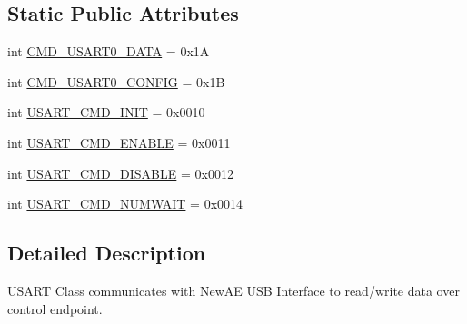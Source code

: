 \subsection*{Static Public Attributes}
\begin{DoxyCompactItemize}
\item 
int \hyperlink{classsoftware_1_1chipwhisperer_1_1hardware_1_1naeusb_1_1serial_1_1USART_a3f9357acd1d1f64c542e942d9afabf96}{C\+M\+D\+\_\+\+U\+S\+A\+R\+T0\+\_\+\+D\+A\+T\+A} = 0x1\+A
\item 
int \hyperlink{classsoftware_1_1chipwhisperer_1_1hardware_1_1naeusb_1_1serial_1_1USART_ac72ce83097171bd79f0bf6551b85079b}{C\+M\+D\+\_\+\+U\+S\+A\+R\+T0\+\_\+\+C\+O\+N\+F\+I\+G} = 0x1\+B
\item 
int \hyperlink{classsoftware_1_1chipwhisperer_1_1hardware_1_1naeusb_1_1serial_1_1USART_a5ea2806550d1f6c14eaf1f7442ceeacc}{U\+S\+A\+R\+T\+\_\+\+C\+M\+D\+\_\+\+I\+N\+I\+T} = 0x0010
\item 
int \hyperlink{classsoftware_1_1chipwhisperer_1_1hardware_1_1naeusb_1_1serial_1_1USART_a8bb28b8a70d62bff06e279ff9bdddd2d}{U\+S\+A\+R\+T\+\_\+\+C\+M\+D\+\_\+\+E\+N\+A\+B\+L\+E} = 0x0011
\item 
int \hyperlink{classsoftware_1_1chipwhisperer_1_1hardware_1_1naeusb_1_1serial_1_1USART_a3618dbec7e4dec6c8fb0067e3a6e7a16}{U\+S\+A\+R\+T\+\_\+\+C\+M\+D\+\_\+\+D\+I\+S\+A\+B\+L\+E} = 0x0012
\item 
int \hyperlink{classsoftware_1_1chipwhisperer_1_1hardware_1_1naeusb_1_1serial_1_1USART_a53da7293e0cbebad1283395b8cbb34bf}{U\+S\+A\+R\+T\+\_\+\+C\+M\+D\+\_\+\+N\+U\+M\+W\+A\+I\+T} = 0x0014
\end{DoxyCompactItemize}


\subsection{Detailed Description}
\begin{DoxyVerb}USART Class communicates with NewAE USB Interface to read/write data over control endpoint.
\end{DoxyVerb}
 

